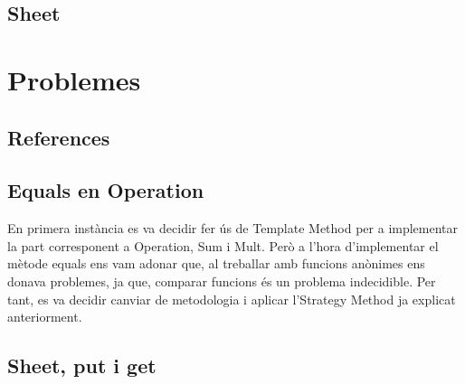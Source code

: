 \documentclass{article}
\begin{document}
	\subsection{Sheet}%
	\section{Problemes}
	\subsection{References}%
	\subsection{Equals en Operation}%
En primera instància es va decidir fer ús de Template Method per a implementar la part corresponent a Operation, Sum i Mult. Però a l'hora d'implementar el mètode equals ens vam adonar que, al treballar amb funcions anònimes ens donava problemes, ja que, comparar funcions és un problema indecidible. Per tant, es va decidir canviar de metodologia i aplicar l'Strategy Method ja explicat anteriorment.
	\subsection{Sheet, put i get}%
	
\end{document}
